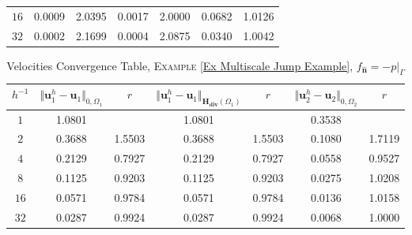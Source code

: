 \documentclass[3p]{elsarticle}
\def\uone{\mathbf{u}_{1}}
\def\utwo{\mathbf{u}_{2}}
\def\Hdiv{\mathbf{H_{div}}}
\def\flux{f_{\bm{\hat{n}} } }
\begin{document}
\begin{example}
\begin{table}[h!]
\begin{center}
\begin{tabular}{ c c c c c c c }
%
$ 16 $  &  0.0009  &     2.0395 &  0.0017  & 2.0000    &  0.0682  &  1.0126 \\ 
%
$ 32 $  &  0.0002  &     2.1699  &  0.0004  & 2.0875   &  0.0340   &   1.0042  \\ 
%
    \hline
\end{tabular}
\end{center}
%
\end{table}
%
%
\begin{table*}[h!]
\caption{Velocities Convergence Table, \textsc{Example} \ref{Ex Multiscale Jump Example}, $ \flux = - p\big\vert_{\Gamma} $}\label{Table Mult Jump Velocity Approximation}
\def\arraystretch{1.4}
\begin{center}
\begin{tabular}{ c c c c c c c }
    \hline
    \rowcolor{gray!50}
$ h^{-1} $  
& $\Vert  \uone^{h}- \uone  \Vert_{ 0, \Omega_{1} } $ 
& $r$  
& $\Vert  \uone^{h}- \uone  \Vert_{\Hdiv(\Omega_{1})}$ 
& $r$
&  $\Vert  \utwo^{h}- \utwo  \Vert_{ 0, \Omega_{2} } $
& $r$ \\ %
    \toprule
$ 1 $ &   1.0801 &    &   1.0801 &  &   0.3538  & \\
$ 2 $  &   0.3688  &  1.5503   &  0.3688  &  1.5503   &  0.1080   &  1.7119 \\
$ 4 $ &   0.2129  &  0.7927  &  0.2129  &   0.7927  &  0.0558   &  0.9527 \\
$ 8 $  &  0.1125  &   0.9203  &  0.1125  &   0.9203   &   0.0275 &  1.0208   \\ 
%
$ 16 $  &  0.0571  &  0.9784  &  0.0571  &  0.9784   &  0.0136  &  1.0158   \\ 
%
$ 32 $  &  0.0287  & 0.9924  &  0.0287   &  0.9924   &  0.0068  &  1.0000   \\ 
%
    \hline
\end{tabular}
\end{center}
%
\end{table*}
%
%


\end{example}
\end{document}
